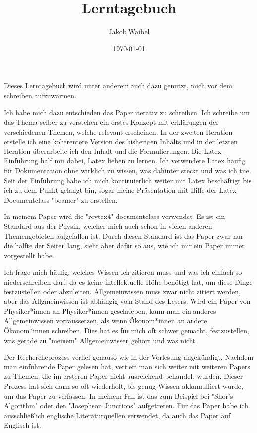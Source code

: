 \documentclass{scrarticle}
\begin{document}
\title{Lerntagebuch}
\author{Jakob Waibel}
\date{\today}

\maketitle 
Dieses Lerntagebuch wird unter anderem auch dazu genutzt, mich vor dem schreiben aufzuwärmen.

Ich habe mich dazu entschieden das Paper iterativ zu schreiben. Ich schreibe um das Thema selber zu verstehen ein erstes Konzept mit erklärungen der verschiedenen Themen, welche relevant erscheinen. In der zweiten Iteration erstelle ich eine koherentere Version des bisherigen Inhalts und in der letzten Iteration überarbeite ich den Inhalt und die Formulierungen.
Die Latex-Einführung half mir dabei, Latex lieben zu lernen. Ich verwendete Latex häufig für Dokumentation ohne wirklich zu wissen, was dahinter steckt und was ich tue. Seit der Einführung habe ich mich kontinuierlich weiter mit Latex beschäftigt bis ich zu dem Punkt gelangt bin, sogar meine Präsentation mit Hilfe der Latex-Documentclass "beamer" zu erstellen. 

In meinem Paper wird die "revtex4" documentclass verwendet. Es ist ein Standard aus der Physik, welcher mich auch schon in vielen anderen Themengebieten aufgefallen ist. Durch diesen Standard ist das Paper zwar nur die hälfte der Seiten lang, sieht aber dafür so aus, wie ich mir ein Paper immer vorgestellt habe. 

Ich frage mich häufig, welches Wissen ich zitieren muss und was ich einfach so niederschreiben darf, da es keine intellektuelle Höhe benötigt hat, um diese Dinge festzustellen oder abzuleiten. Allgemeinwissen muss zwar nicht zitiert werden, aber das Allgmeinwissen ist abhängig vom Stand des Lesers. Wird ein Paper von Physiker*innen an Physiker*innen geschrieben, kann man ein anderes Allgemeinwissen vorraussetzen, als wenn Ökonom*innen an andere Ökonom*innen schreiben. Dies hat es für mich oft schwer gemacht, festzustellen, was gerade zu "meinem" Allgemeinwissen gehört und was nicht.

Der Rechercheprozess verlief genauso wie in der Vorlesung angekündigt. Nachdem man einführende Paper gelesen hat, vertieft man sich weiter mit weiteren Papers zu Themen, die im ersteren Paper nicht ausreichend behandelt wurden. Dieser Prozess hat sich dann so oft wiederholt, bis genug Wissen akkumulliert wurde, um das Paper zu verfassen. In meinem Fall ist das zum Beispiel bei "Shor's Algorithm" oder den "Josephson Junctions" aufgetreten.
Für das Paper habe ich ausschließlich englische Literaturquellen verwendet, da auch das Paper auf Englisch ist.
\end{document}
